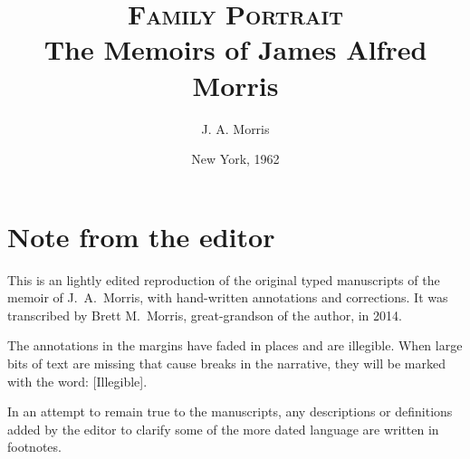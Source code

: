 \documentclass[12pt]{book}              %
\title{\textsc{Family Portrait}\\ The Memoirs of James Alfred Morris}    %
\author{J. A. Morris}              %
\date{New York, 1962}                           %
\begin{document}
\frontmatter                            %

\section*{Note from the editor}
This is an lightly edited reproduction of the original typed manuscripts of the memoir of J.~A.~Morris, with hand-written annotations and corrections. It was transcribed by Brett M.~Morris, great-grandson of the author, in 2014. 

The annotations in the margins have faded in places and are illegible. When large bits of text are missing that cause breaks in the narrative, they will be marked with the word: [Illegible]. %

In an attempt to remain true to the manuscripts, any descriptions or definitions added by the editor to clarify some of the more dated language are written in footnotes. 



\maketitle                              %
\tableofcontents                        %
\mainmatter                             %
\end{document}
